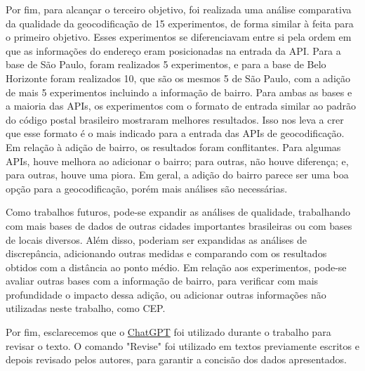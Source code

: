 Por fim, para alcançar o terceiro objetivo, foi realizada uma análise comparativa da qualidade da geocodificação de 15 experimentos, de forma similar à feita para o primeiro objetivo. Esses experimentos se diferenciavam entre si pela ordem em que as informações do endereço eram posicionadas na entrada da API. Para a base de São Paulo, foram realizados 5 experimentos, e para a base de Belo Horizonte foram realizados 10, que são os mesmos 5 de São Paulo, com a adição de mais 5 experimentos incluindo a informação de bairro. Para ambas as bases e a maioria das APIs, os experimentos com o formato de entrada similar ao padrão do código postal brasileiro mostraram melhores resultados. Isso nos leva a crer que esse formato é o mais indicado para a entrada das APIs de geocodificação. Em relação à adição de bairro, os resultados foram conflitantes. Para algumas APIs, houve melhora ao adicionar o bairro; para outras, não houve diferença; e, para outras, houve uma piora. Em geral, a adição do bairro parece ser uma boa opção para a geocodificação, porém mais análises são necessárias.

Como trabalhos futuros, pode-se expandir as análises de qualidade, trabalhando com mais bases de dados de outras cidades importantes brasileiras ou com bases de locais diversos. Além disso, poderiam ser expandidas as análises de discrepância, adicionando outras medidas e comparando com os resultados obtidos com a distância ao ponto médio. Em relação aos experimentos, pode-se avaliar outras bases com a informação de bairro, para verificar com mais profundidade o impacto dessa adição, ou adicionar outras informações não utilizadas neste trabalho, como CEP.

Por fim, esclarecemos que o \href{https://chat.openai.com/auth/login?next=%2F}{ChatGPT} foi utilizado durante o trabalho para revisar o texto. O comando "Revise" foi utilizado em textos previamente escritos e depois revisado pelos autores, para garantir a concisão dos dados apresentados. 
 
